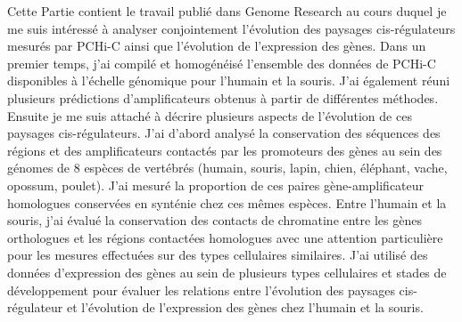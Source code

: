 Cette Partie contient le travail publié dans Genome Research au cours duquel je me suis intéressé à analyser conjointement l’évolution des paysages \gls{cis}-régulateurs mesurés par \acrshort{PCHi-C} ainsi que l’évolution de l’expression des gènes. Dans un premier temps, j’ai compilé et homogénéisé l’ensemble des données de \acrshort{PCHi-C} disponibles à l’échelle génomique pour l’humain et la souris. J’ai également réuni plusieurs prédictions d’\glspl{amplificateur} obtenus à partir de différentes méthodes. Ensuite je me suis attaché à décrire plusieurs aspects de l’évolution de ces paysages \gls{cis}-régulateurs. J’ai d’abord analysé la conservation des séquences des régions et des \glspl{amplificateur} contactés par les promoteurs des gènes au sein des génomes de 8 espèces de vertébrés (humain, souris, lapin, chien, éléphant, vache, opossum, poulet). J’ai mesuré la proportion de ces paires gène-\gls{amplificateur} homologues conservées en synténie chez ces mêmes espèces. Entre l’humain et la souris, j’ai évalué la conservation des contacts de chromatine entre les gènes orthologues et les régions contactées homologues avec une attention particulière pour les mesures effectuées sur des types cellulaires similaires. J’ai utilisé des données d’expression des gènes au sein de plusieurs types cellulaires et stades de développement pour évaluer les relations entre l’évolution des paysages \gls{cis}-régulateur et l’évolution de l’expression des gènes chez l’humain et la souris. \\

